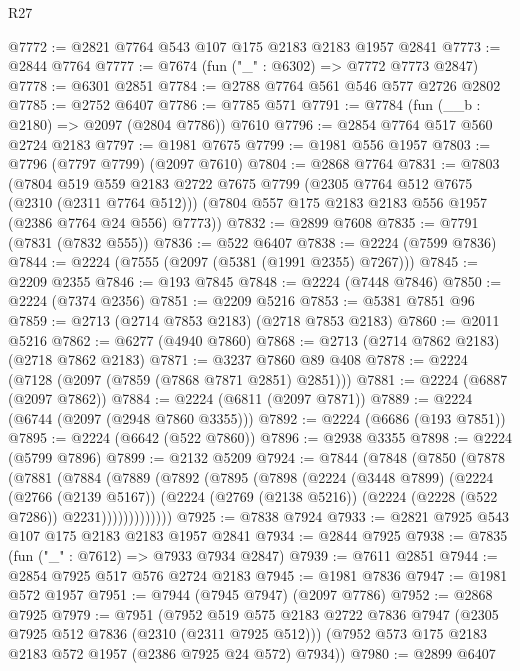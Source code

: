 \begin{lexlean}{R27}
\begin{coremodule}
@7772 := @2821 @7764 @543 @107 @175 @2183 @2183 @1957 @2841
@7773 := @2844 @7764
@7777 := @7674 (fun ("_" : @6302) => @7772 @7773 @2847)
@7778 := @6301 @2851
@7784 := @2788 @7764 @561 @546 @577 @2726 @2802
@7785 := @2752 @6407
@7786 := @7785 @571
@7791 := @7784 (fun (__b : @2180) => @2097 (@2804 @7786)) @7610
@7796 := @2854 @7764 @517 @560 @2724 @2183
@7797 := @1981 @7675
@7799 := @1981 @556 @1957
@7803 := @7796 (@7797 @7799) (@2097 @7610)
@7804 := @2868 @7764
@7831 := @7803
    (@7804
      @519
      @559
      @2183
      @2722
      @7675
      @7799
      (@2305 @7764 @512 @7675 (@2310 (@2311 @7764 @512)))
      (@7804 @557 @175 @2183 @2183 @556 @1957 (@2386 @7764 @24 @556) @7773))
@7832 := @2899 @7608
@7835 := @7791 (@7831 (@7832 @555))
@7836 := @522 @6407
@7838 := @2224 (@7599 @7836)
@7844 := @2224 (@7555 (@2097 (@5381 (@1991 @2355) @7267)))
@7845 := @2209 @2355
@7846 := @193 @7845
@7848 := @2224 (@7448 @7846)
@7850 := @2224 (@7374 @2356)
@7851 := @2209 @5216
@7853 := @5381 @7851 @96
@7859 := @2713 (@2714 @7853 @2183) (@2718 @7853 @2183)
@7860 := @2011 @5216
@7862 := @6277 (@4940 @7860)
@7868 := @2713 (@2714 @7862 @2183) (@2718 @7862 @2183)
@7871 := @3237 @7860 @89 @408
@7878 := @2224 (@7128 (@2097 (@7859 (@7868 @7871 @2851) @2851)))
@7881 := @2224 (@6887 (@2097 @7862))
@7884 := @2224 (@6811 (@2097 @7871))
@7889 := @2224 (@6744 (@2097 (@2948 @7860 @3355)))
@7892 := @2224 (@6686 (@193 @7851))
@7895 := @2224 (@6642 (@522 @7860))
@7896 := @2938 @3355
@7898 := @2224 (@5799 @7896)
@7899 := @2132 @5209
@7924 := @7844
    (@7848
      (@7850
        (@7878
          (@7881
            (@7884
              (@7889
                (@7892
                  (@7895
                    (@7898
                      (@2224
                        (@3448 @7899)
                        (@2224
                          (@2766 (@2139 @5167))
                          (@2224
                            (@2769 (@2138 @5216))
                            (@2224 (@2228 (@522 @7286)) @2231)))))))))))))
@7925 := @7838 @7924
@7933 := @2821 @7925 @543 @107 @175 @2183 @2183 @1957 @2841
@7934 := @2844 @7925
@7938 := @7835 (fun ("_" : @7612) => @7933 @7934 @2847)
@7939 := @7611 @2851
@7944 := @2854 @7925 @517 @576 @2724 @2183
@7945 := @1981 @7836
@7947 := @1981 @572 @1957
@7951 := @7944 (@7945 @7947) (@2097 @7786)
@7952 := @2868 @7925
@7979 := @7951
    (@7952
      @519
      @575
      @2183
      @2722
      @7836
      @7947
      (@2305 @7925 @512 @7836 (@2310 (@2311 @7925 @512)))
      (@7952 @573 @175 @2183 @2183 @572 @1957 (@2386 @7925 @24 @572) @7934))
@7980 := @2899 @6407

\end{coremodule}
\end{lexlean}
